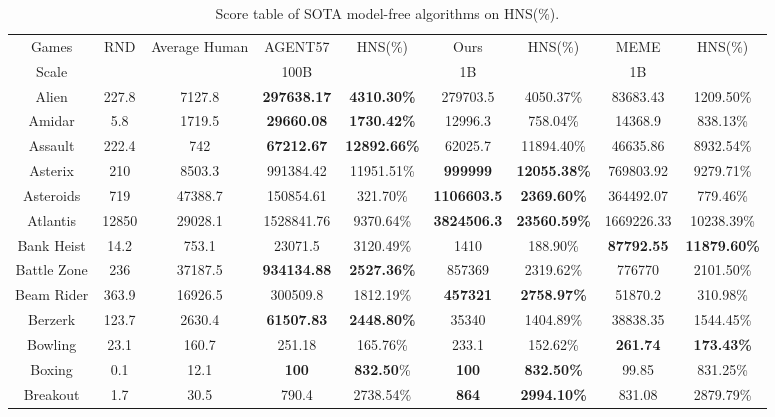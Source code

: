 \begin{table}[!hb]
\footnotesize
\begin{center}
\caption{Score table of  SOTA  model-free algorithms on HNS(\%).}
\label{Tab:Score table of SOTA  model-free algorithms on HNS.}
\setlength{\tabcolsep}{1.0pt}
\begin{tabular}{c c c c c c c cc}
\toprule
Games & RND & Average Human & AGENT57 & HNS(\%) & Ours & HNS(\%) & MEME & HNS(\%) \\
        Scale & ~ & ~ & 100B & ~ & 1B & ~ & 1B & ~\\ \midrule
        Alien & 227.8 & 7127.8 & \textbf{297638.17} & \textbf{4310.30\%} & 279703.5 & 4050.37\% & 83683.43&	1209.50\%\\  
        Amidar & 5.8 & 1719.5 & \textbf{29660.08} & \textbf{1730.42\%} & 12996.3 & 758.04\%  & 14368.9	&838.13\%\\  
        Assault & 222.4 & 742 & \textbf{67212.67} & \textbf{12892.66\%} & 62025.7 & 11894.40\% & 46635.86	& 8932.54\%\\  
        Asterix & 210 & 8503.3 & 991384.42 & 11951.51\% & \textbf{999999} & \textbf{12055.38\%} & 769803.92	& 9279.71\%\\  
        Asteroids & 719 & 47388.7 & 150854.61 & 321.70\% & \textbf{1106603.5} & \textbf{2369.60\%} & 364492.07	& 779.46\%\\  
        Atlantis & 12850 & 29028.1 & 1528841.76 & 9370.64\% & \textbf{3824506.3} & \textbf{23560.59\%} & 1669226.33	& 10238.39\%\\  
        Bank Heist & 14.2 & 753.1 & 23071.5& 3120.49\% & 1410 & 188.90\% & \textbf{87792.55}	& \textbf{11879.60\%}\\  
        Battle Zone & 236 & 37187.5 & \textbf{934134.88} & \textbf{2527.36\%} & 857369 & 2319.62\% & 776770	& 2101.50\%\\  
        Beam Rider & 363.9 & 16926.5 & 300509.8 & 1812.19\% & \textbf{457321} & \textbf{2758.97\%} & 51870.2 &	310.98\%\\  
        Berzerk & 123.7 & 2630.4 & \textbf{61507.83} & \textbf{2448.80\%} & 35340 & 1404.89\% & 38838.35	& 1544.45\%\\  
        Bowling & 23.1 & 160.7 & 251.18 & 165.76\% & 233.1 & 152.62\% & \textbf{261.74} &	\textbf{173.43\%}\\  
        Boxing & 0.1 & 12.1 & \textbf{100} & \textbf{832.50}\% & \textbf{100} & \textbf{832.50\%} & 99.85 &	831.25\%\\  
        Breakout & 1.7 & 30.5 & 790.4 & 2738.54\% & \textbf{864} & \textbf{2994.10\%} & 831.08 &	2879.79\% \\  

\end{tabular}
\end{center}
\end{table}
